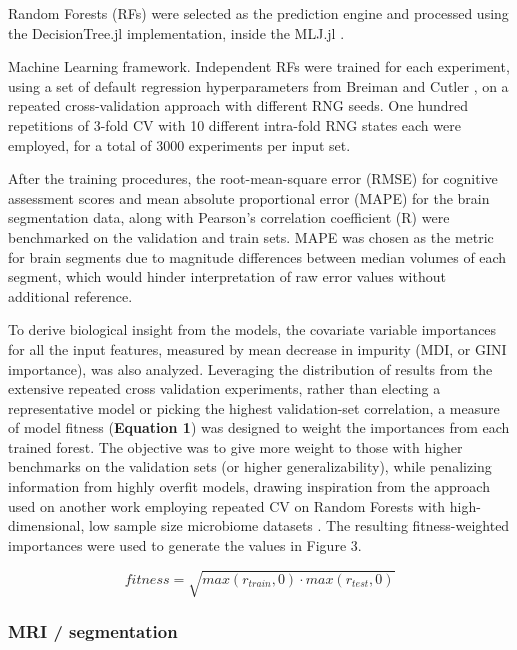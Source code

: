 \documentclass{article}
\begin{document}
Random Forests (RFs)
\cite{breimanRandomForests2001}
were selected as the prediction engine and processed using the
DecisionTree.jl \cite{sadeghiDecisionTreeJlJulia2022}
implementation, inside the MLJ.jl \cite{blaomMLJJuliaPackage2020}.

Machine Learning framework. Independent RFs were trained for each
experiment, using a set of default regression hyperparameters from
Breiman and Cutler \cite{breimanRandomForests2001},
on a repeated cross-validation approach with different RNG seeds. One hundred
repetitions of 3-fold CV with 10 different intra-fold RNG states each
were employed, for a total of 3000 experiments per input set.

After the training procedures, the root-mean-square error (RMSE) for
cognitive assessment scores and mean absolute proportional error (MAPE)
for the brain segmentation data, along with Pearson's
correlation coefficient (R) were benchmarked on the validation and train
sets. MAPE was chosen as the metric for brain segments due to magnitude
differences between median volumes of each segment, which would hinder
interpretation of raw error values without additional reference.

To derive biological insight from the models, the covariate variable
importances for all the input features, measured by mean decrease in
impurity (MDI, or GINI importance), was also analyzed. Leveraging the
distribution of results from the extensive repeated cross validation
experiments, rather than electing a representative model or picking the
highest validation-set correlation, a measure of model fitness
(\textbf{Equation 1}) was designed to weight the importances from each
trained forest. The objective was to give more weight to those with
higher benchmarks on the validation sets (or higher generalizability),
while penalizing information from highly overfit models, drawing
inspiration from the approach used on another work employing repeated CV
on Random Forests with high-dimensional, low sample size microbiome
datasets \cite{woodruffInflammationAutoreactivityDefine2022}.
The resulting fitness-weighted importances were used
to generate the values in Figure 3.

\begin{equation}
    fitness = \sqrt{max(r_{train}, 0) \cdot max(r_{test}, 0)}
\end{equation}


\subsubsection*{MRI / segmentation}
\end{document}
